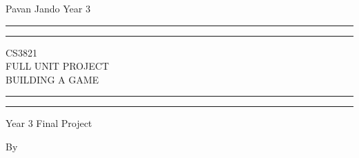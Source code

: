 \documentclass[a4paper]{report}
\begin{document}
 

\begin{titlepage} %
	
	Pavan Jando Year 3
	
	\centering %
	
	\scshape %
	
	\vspace*{\baselineskip} %
	
	
	\rule{\textwidth}{1.6pt}\vspace*{-\baselineskip}\vspace*{2pt} %
	\rule{\textwidth}{0.4pt} %
	
	\vspace{0.75\baselineskip} %
	
	{\LARGE CS3821\\ FULL UNIT PROJECT\\ BUILDING A GAME\\} %
	
	\vspace{0.75\baselineskip} %
	
	\rule{\textwidth}{0.4pt}\vspace*{-\baselineskip}\vspace{3.2pt} %
	\rule{\textwidth}{1.6pt} %
	
	\vspace{2\baselineskip} %
	
	
	Year 3 Final Project %
	
	\vspace*{3\baselineskip} %
	
	
	By
	 			
	\vspace{0.5\baselineskip} %
	

\end{titlepage}
\end{document}
